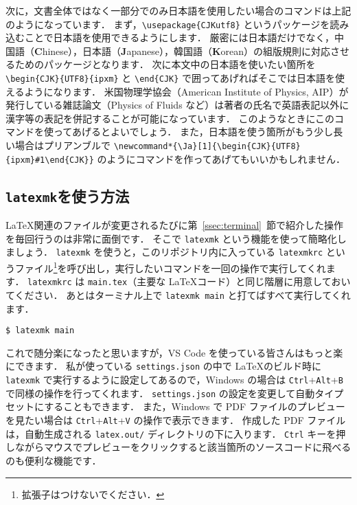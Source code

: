 次に，文書全体ではなく一部分でのみ日本語を使用したい場合のコマンドは上記のようになっています．
まず，\verb|\usepackage{CJKutf8}| というパッケージを読み込むことで日本語を使用できるようにします．
厳密には日本語だけでなく，中国語（\textbf{C}hinese），日本語（\textbf{J}apanese），韓国語（\textbf{K}orean）の組版規則に対応させるためのパッケージとなります．
次に本文中の日本語を使いたい箇所を \verb|\begin{CJK}{UTF8}{ipxm}| と \verb|\end{CJK}| で囲ってあげればそこでは日本語を使えるようになります．
米国物理学協会（American Institute of Physics, AIP）が発行している雑誌論文（Physics of Fluids など）は著者の氏名で英語表記以外に漢字等の表記を併記することが可能になっています．
このようなときにこのコマンドを使ってあげるとよいでしょう．
また，日本語を使う箇所がもう少し長い場合はプリアンブルで \verb|\newcommand*{\Ja}[1]{\begin{CJK}{UTF8}{ipxm}#1\end{CJK}}| のようにコマンドを作ってあげてもいいかもしれません．

\subsection{\texttt{latexmk}を使う方法}
\label{ssec:latexmk}

\LaTeX 関連のファイルが変更されるたびに第~\ref{ssec:terminal}~節で紹介した操作を毎回行うのは非常に面倒です．
そこで \verb|latexmk| という機能を使って簡略化しましょう．
\verb|latexmk| を使うと，このリポジトリ内に入っている \verb|latexmkrc| というファイル\footnote{拡張子はつけないでください．}を呼び出し，実行したいコマンドを一回の操作で実行してくれます．
\verb|latexmkrc| は \verb|main.tex|（主要な \LaTeX コード）と同じ階層に用意しておいてください．
あとはターミナル上で \verb|latexmk main| と打てばすべて実行してくれます．

\begin{tcolorbox}[title={\texttt{latexmk} を使用}, colback=red!5!white, colframe=red!75!black]
\begin{verbatim}
$ latexmk main
\end{verbatim}
\end{tcolorbox}

これで随分楽になったと思いますが，VS Code を使っている皆さんはもっと楽にできます．
私が使っている \verb|settings.json| の中で \LaTeX のビルド時に \verb|latexmk| で実行するように設定してあるので，Windows の場合は \verb|Ctrl|+\verb|Alt|+\verb|B| で同様の操作を行ってくれます．
\verb|settings.json| の設定を変更して自動タイプセットにすることもできます．
また，Windows で PDF ファイルのプレビューを見たい場合は \verb|Ctrl|+\verb|Alt|+\verb|V| の操作で表示できます．
作成した PDF ファイルは，自動生成される \verb|latex.out/| ディレクトリの下に入ります．
\verb|Ctrl| キーを押しながらマウスでプレビューをクリックすると該当箇所のソースコードに飛べるのも便利な機能です．


